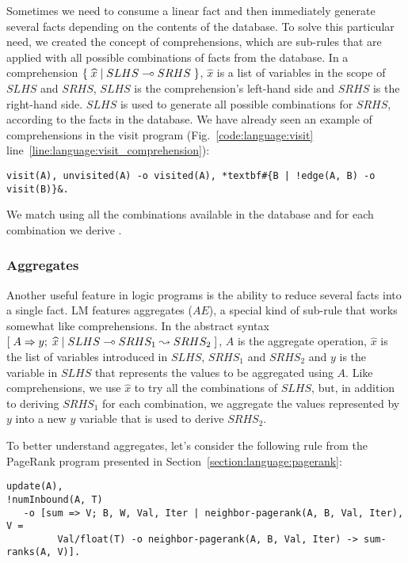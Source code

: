 Sometimes we need to consume a linear fact and then immediately generate several
facts depending on the contents of the database. To solve this particular need,
we created the concept of comprehensions, which are sub-rules that are applied
with all possible combinations of facts from the database. In a comprehension
$\{ \; \widehat{x} \; | \; SLHS \multimap SRHS \; \}$, $\widehat{x}$ is a list of variables
in the scope of $SLHS$ and $SRHS$, $SLHS$ is the comprehension's left-hand side
and $SRHS$ is the right-hand side. $SLHS$ is used to generate all possible
combinations for $SRHS$, according to the facts in the database. We have already
seen an example of comprehensions in the visit program
(Fig.~\ref{code:language:visit} line~\ref{line:language:visit_comprehension}):

\begin{Verbatim}[fontsize=\codesize,commandchars=\*\#\&]
visit(A), unvisited(A) -o visited(A), *textbf#{B | !edge(A, B) -o visit(B)}&.
\end{Verbatim}

We match  using all the combinations available in the database
and for each combination we derive .

\subsubsection{Aggregates}

Another useful feature in logic programs is the ability to reduce several facts
into a single fact. LM features aggregates ($AE$), a special kind of sub-rule
that works somewhat like comprehensions. In the abstract syntax
$[\; A \Rightarrow y; \; \widehat{x} \; | \; SLHS \multimap SRHS_1 \leadsto SRHS_2 \;]$, $A$ is the aggregate
operation, $\widehat{x}$ is the list of variables introduced in $SLHS$, $SRHS_1$
and $SRHS_2$ and $y$ is the variable in $SLHS$ that represents the values to be
aggregated using $A$. Like comprehensions, we use $\widehat{x}$ to try all the
combinations of $SLHS$, but, in addition to deriving $SRHS_1$ for each
combination, we aggregate the values represented by $y$ into a new $y$ variable
that is used to derive $SRHS_2$.

To better understand aggregates, let's consider the following rule from the
PageRank program presented in Section~\ref{section:language:pagerank}:

\begin{Verbatim}[fontsize=\codesize]
update(A),
!numInbound(A, T)
   -o [sum => V; B, W, Val, Iter | neighbor-pagerank(A, B, Val, Iter), V =
         Val/float(T) -o neighbor-pagerank(A, B, Val, Iter) -> sum-ranks(A, V)].
\end{Verbatim}

